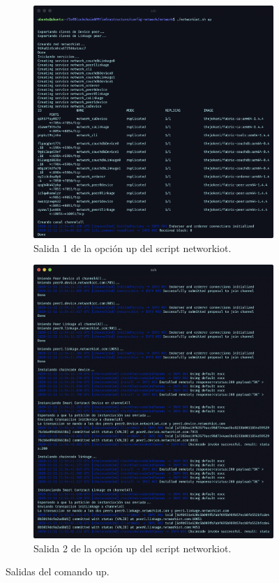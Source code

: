 \begin{figure}[h!]
  \begin{subfigure}{0.5\textwidth}
    \includegraphics[width=\linewidth]{imagenes/desarrollo/comandos/up_1}
    \caption{Salida 1 de la opción up del script networkiot.}
    \label{fig:up-1}
  \end{subfigure}
  \begin{subfigure}{0.5\textwidth}
    \includegraphics[width=\linewidth]{imagenes/desarrollo/comandos/up_2}
    \caption{Salida 2 de la opción up del script networkiot.}
    \label{fig:up-2}
  \end{subfigure}
  \caption{Salidas del comando up.}
  \label{fig:up}
\end{figure}

